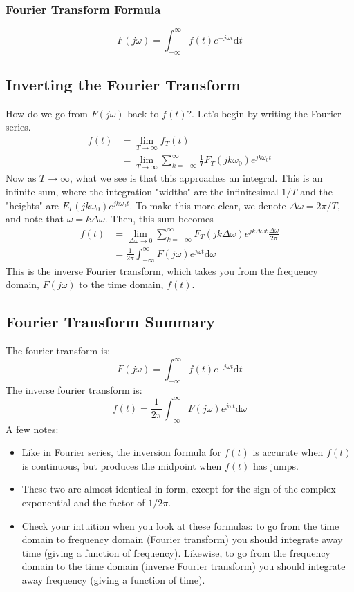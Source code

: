 \documentclass[10pt]{article}
\begin{document}
\subsubsection*{Fourier Transform Formula}
\[F(j\omega) = \int_{-\infty}^\infty f(t) e^{-j\omega t} \text{d}t\]
\subsection*{Inverting the Fourier Transform}
How do we go from $F(j\omega)$ back to $f(t)$?.  Let's begin by writing the Fourier series.
\begin{align*}
    f(t) &= \lim_{T \rightarrow \infty} f_T(t)\\
    &= \lim_{T \rightarrow \infty} \sum_{k = -\infty}^\infty \frac{1}{T} F_T(jk\omega_0)e^{jk\omega_0 t}
\end{align*}
Now as $T \rightarrow \infty$, what we see is that this approaches an integral.  This is an infinite sum, where the integration "widths" are the infinitesimal $1/T$ and the "heights" are $F_T(jk\omega_0)e^{jk\omega_0 t}$.  To make this more clear, we denote $\Delta \omega = 2\pi / T$, and note that $\omega = k\Delta \omega$.  Then, this sum becomes
\begin{align*}
    f(t) &= \lim_{\Delta \omega \rightarrow 0} \sum_{k = -\infty}^\infty F_T(jk\Delta \omega) e^{jk\Delta \omega t} \frac{\Delta \omega}{2\pi}\\
    &= \frac{1}{2\pi} \int_{-\infty}^\infty F(j\omega) e^{j\omega t} \text{d}\omega
\end{align*}
This is the inverse Fourier transform, which takes you from the frequency domain, $F(j\omega)$ to the time domain, $f(t)$.
\subsection*{Fourier Transform Summary}
The fourier transform is:
\[\boxed{F(j\omega) = \int_{-\infty}^\infty f(t) e^{-j\omega t} \text{d}t}\]
The inverse fourier transform is:
\[\boxed{f(t) = \frac{1}{2\pi} \int_{-\infty}^{\infty} F(j\omega)e^{j\omega t} \text{d}\omega}\]
A few notes:
\begin{itemize}
    \item Like in Fourier series, the inversion formula for $f(t)$ is accurate when $f(t)$ is continuous, but produces the midpoint when $f(t)$ has jumps.
    \item These two are almost identical in form, except for the sign of the complex exponential and the factor of $1/2\pi$.
    \item Check your intuition when you look at these formulas: to go from the time domain to frequency domain (Fourier transform) you should integrate away time (giving a function of frequency).  Likewise, to go from the frequency domain to the time domain (inverse Fourier transform) you should integrate away frequency (giving a function of time).
\end{itemize}
\end{document}

